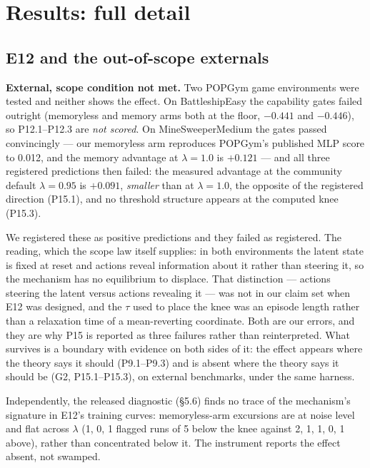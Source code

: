 \section{Results: full detail}
\label{app:results}

\subsection{E12 and the out-of-scope externals}
\label{app:e12}
\textbf{External, scope condition not met.} Two POPGym game environments
were tested and neither shows the effect. On BattleshipEasy the
capability gates failed outright (memoryless and memory arms both at the
floor, \(-0.441\) and \(-0.446\)), so P12.1--P12.3 are \emph{not
scored}. On MineSweeperMedium the gates passed convincingly --- our
memoryless arm reproduces POPGym's published MLP score to 0.012, and the
memory advantage at \(\lambda = 1.0\) is \(+0.121\) --- and all three
registered predictions then failed: the measured advantage at the
community default \(\lambda = 0.95\) is \(+0.091\), \emph{smaller} than
at \(\lambda = 1.0\), the opposite of the registered direction (P15.1),
and no threshold structure appears at the computed knee (P15.3).

We registered these as positive predictions and they failed as
registered. The reading, which the scope law itself supplies: in both
environments the latent state is fixed at reset and actions reveal
information about it rather than steering it, so the mechanism has no
equilibrium to displace. That distinction --- actions steering the
latent versus actions revealing it --- was not in our claim set when E12
was designed, and the $\tau$ used to place the knee was an episode length
rather than a relaxation time of a mean-reverting coordinate. Both are
our errors, and they are why P15 is reported as three failures rather
than reinterpreted. What survives is a boundary with evidence on both
sides of it: the effect appears where the theory says it should
(P9.1--P9.3) and is absent where the theory says it should be (G2,
P15.1--P15.3), on external benchmarks, under the same harness.

Independently, the released diagnostic (\S5.6) finds no trace of the
mechanism's signature in E12's training curves: memoryless-arm
excursions are at noise level and flat across \(\lambda\) (1, 0, 1
flagged runs of 5 below the knee against 2, 1, 1, 0, 1 above), rather
than concentrated below it. The instrument reports the effect absent,
not swamped.


